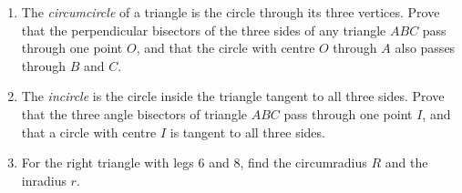 \begin{enumerate}
\item[(a)] The \emph{circumcircle} of a triangle is the circle through its three vertices. Prove that the perpendicular bisectors of the three sides of any triangle $ABC$ pass through one point $O$, and that the circle with centre $O$ through $A$ also passes through $B$ and $C$.
\item[(b)] The \emph{incircle} is the circle inside the triangle tangent to all three sides. Prove that the three angle bisectors of triangle $ABC$ pass through one point $I$, and that a circle with centre $I$ is tangent to all three sides.
\item[(c)] For the right triangle with legs $6$ and $8$, find the circumradius $R$ and the inradius $r$.
\end{enumerate}
